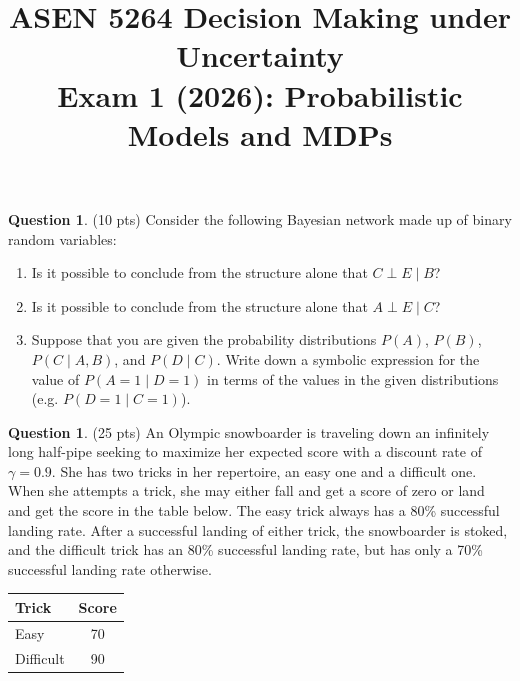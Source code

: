 \documentclass{article}
\title{ASEN 5264 Decision Making under Uncertainty\\
       Exam 1 (2026): Probabilistic Models and MDPs}
\theoremstyle{definition}
\newtheorem{question}[thm]{Question}
\begin{document}
\maketitle


\begin{question} (10 pts)
Consider the following Bayesian network made up of binary random variables:
\begin{center}
\end{center}


\begin{enumerate}[label=\alph*)]
    \item Is it possible to conclude from the structure alone that $C \perp E \mid B$?
    \item Is it possible to conclude from the structure alone that $A \perp E \mid C$?

    \item Suppose that you are given the probability distributions $P(A)$, $P(B)$, $P(C \mid A, B)$, and $P(D \mid C)$. Write down a symbolic expression for the value of $P(A=1 \mid D=1)$ in terms of the values in the given distributions (e.g. $P(D=1 \mid C=1)$).
\end{enumerate}
\end{question}



\clearpage

\begin{question}(25 pts)
    An Olympic snowboarder is traveling down an infinitely long half-pipe seeking to maximize her expected score with a discount rate of $\gamma=0.9$. She has two tricks in her repertoire, an easy one and a difficult one. When she attempts a trick, she may either fall and get a score of zero or land and get the score in the table below. The easy trick always has a 80\% successful landing rate.
    After a successful landing of either trick, the snowboarder is stoked, and the difficult trick has an 80\% successful landing rate, but has only a 70\% successful landing rate otherwise.

    \begin{center}
    \begin{tabular}{lc}
        \toprule
        Trick & Score \\
        \midrule
        Easy & 70 \\
        Difficult & 90 \\
        \bottomrule
    \end{tabular}
    \end{center}
\end{question}
\end{document}
